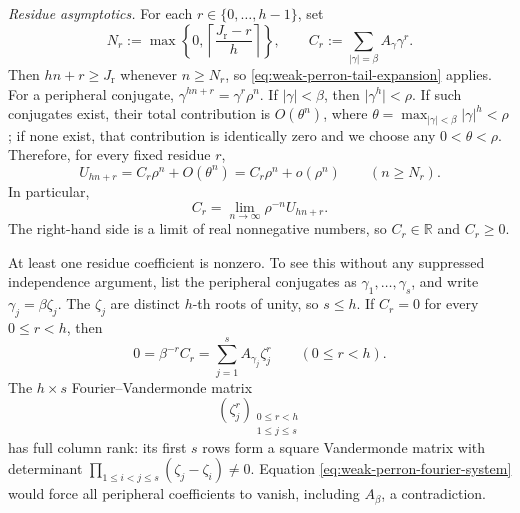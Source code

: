   \emph{Residue asymptotics.}
  For each \(r\in\{0,\ldots,h-1\}\), set
  \begin{equation}
    N_r:=\max\!\left\{0,
      \left\lceil\frac{J_{\mathrm r}-r}{h}\right\rceil\right\},
    \qquad
    C_r:=\sum_{\lvert\gamma\rvert=\beta}A_\gamma\gamma^r.
    \label{eq:weak-perron-residue-threshold-coefficient}
  \end{equation}
  Then \(hn+r\ge J_{\mathrm r}\) whenever \(n\ge N_r\), so
  \eqref{eq:weak-perron-tail-expansion} applies. For a peripheral conjugate,
  \(\gamma^{hn+r}=\gamma^r\rho^n\).
  If \(\lvert\gamma\rvert<\beta\), then
  \(\lvert\gamma^h\rvert<\rho\). If such conjugates exist, their total
  contribution is \(O(\theta^n)\), where
  \(\theta=\max_{\lvert\gamma\rvert<\beta}\lvert\gamma\rvert^h<\rho\);
  if none exist, that contribution is identically zero and we choose any
  \(0<\theta<\rho\). Therefore, for
  every fixed residue \(r\),
  \begin{equation}
    U_{hn+r}=C_r\rho^n+O(\theta^n)
             =C_r\rho^n+o(\rho^n)
    \qquad(n\ge N_r).
    \label{eq:weak-perron-residue-asymptotic}
  \end{equation}
  In particular,
  \[
    C_r=\lim_{n\to\infty}\rho^{-n}U_{hn+r}.
  \]
  The right-hand side is a limit of real nonnegative numbers, so
  \(C_r\in\mathbb R\) and \(C_r\ge0\).

  At least one residue coefficient is nonzero. To see this without any
  suppressed independence argument, list the peripheral conjugates as
  \(\gamma_1,\ldots,\gamma_s\), and write
  \(\gamma_j=\beta\zeta_j\). The \(\zeta_j\) are distinct \(h\)-th
  roots of unity, so \(s\le h\). If \(C_r=0\) for every
  \(0\le r<h\), then
  \begin{equation}
    0=\beta^{-r}C_r
      =\sum_{j=1}^s A_{\gamma_j}\zeta_j^r
      \qquad(0\le r<h).
      \label{eq:weak-perron-fourier-system}
  \end{equation}
  The \(h\times s\) Fourier--Vandermonde matrix
  \[
    (\zeta_j^r)_{\substack{0\le r<h\\1\le j\le s}}
  \]
  has full column rank: its first \(s\) rows form a square Vandermonde
  matrix with determinant
  \(\prod_{1\le i<j\le s}(\zeta_j-\zeta_i)\ne0\).
  Equation \eqref{eq:weak-perron-fourier-system} would force all
  peripheral coefficients to vanish,
  including \(A_\beta\), a contradiction.

